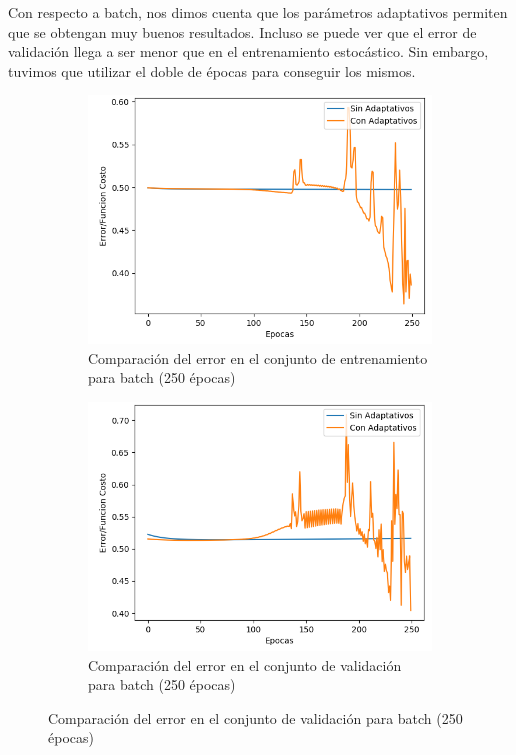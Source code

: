 Con respecto a batch, nos dimos cuenta que los parámetros adaptativos permiten que se obtengan muy buenos resultados. Incluso se puede ver que el error de 
validación llega a ser menor que en el entrenamiento estocástico. Sin embargo, tuvimos que utilizar el doble de épocas para conseguir los mismos. 

\begin{figure}[!htbp]
\centering
\begin{subfigure}{.5\textwidth}
  \centering
  \includegraphics[width=1\linewidth]{graficos/adaptativos_promedios_entrenamiento_batch_05.png}
  \caption{Comparación del error en el conjunto de entrenamiento para batch (250 épocas)}
  \label{fig:sub1}
\end{subfigure}%
\begin{subfigure}{.5\textwidth}
  \centering
  \includegraphics[width=1\linewidth]{graficos/adaptativos_promedios_validacion_batch_05.png}
  \caption{Comparación del error en el conjunto de validación para batch (250 épocas)}
  \label{fig:sub2}
\end{subfigure}
\end{figure}

